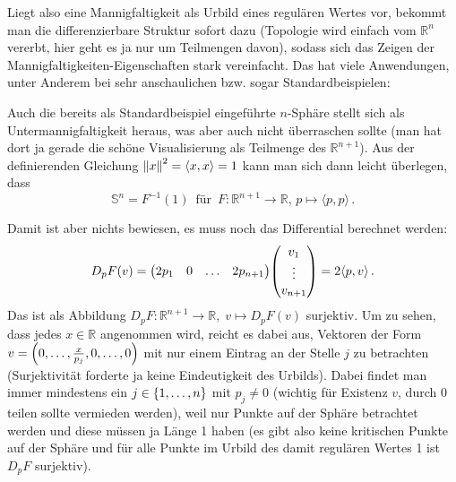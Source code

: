 \documentclass[../H_Analysis_main.tex]{subfiles}
\begin{document}
Liegt also eine Mannigfaltigkeit als Urbild eines regulären Wertes vor, bekommt man die differenzierbare Struktur sofort dazu (Topologie wird einfach vom $\mathbb{R}^n$ vererbt, hier geht es ja nur um Teilmengen davon), sodass sich das Zeigen der Mannigfaltigkeiten-Eigenschaften stark vereinfacht. Das hat viele Anwendungen, unter Anderem bei sehr anschaulichen bzw. sogar Standardbeispielen:
\begin{bsp}[Sphäre]\label{bsp:kugelumf}
Auch die bereits als Standardbeispiel eingeführte $n$-Sphäre stellt sich als Untermannigfaltigkeit heraus, was aber auch nicht überraschen sollte (man hat dort ja gerade die schöne Visualisierung als Teilmenge des $\mathbb{R}^{n + 1}$). Aus der definierenden Gleichung $\norm{x}^2 = \langle x, x \rangle = 1$ kann man sich dann leicht überlegen, dass
\begin{equation}
\mathbb{S}^n = F^{-1}(1) \,  \text{ für } \, F: \mathbb{R}^{n+1} \rightarrow \mathbb{R}, \, p \mapsto \langle p, p \rangle \, .
\end{equation}

Damit ist aber nichts bewiesen, es muss noch das Differential berechnet werden:
\begin{equation}
D_p F(v) = \mqty(2 p_1 & 0 & \dots & 2 p_{n + 1}) \mqty(v_1 \\ \vdots \\ v_{n + 1}) = 2 \langle p, v \rangle \, .
\end{equation}
Das ist als Abbildung $D_p F: \mathbb{R}^{n + 1} \rightarrow \mathbb{R}, \; v \mapsto D_p F(v)$ surjektiv. Um zu sehen, dass jedes $x \in \mathbb{R}$ angenommen wird, reicht es dabei aus, Vektoren der Form $v = \qty(0, \dots, \frac{x}{p_j}, 0, \dots, 0)$ mit nur einem Eintrag an der Stelle $j$ zu betrachten (Surjektivität forderte ja keine Eindeutigkeit des Urbilds). Dabei findet man immer mindestens ein $j \in \qty{1, \dots, n}$ mit $p_j \neq 0$ (wichtig für Existenz $v$, durch 0 teilen sollte vermieden werden), weil nur Punkte auf der Sphäre betrachtet werden und diese müssen ja Länge 1 haben (es gibt also keine kritischen Punkte auf der Sphäre und für alle Punkte im Urbild des damit regulären Wertes 1 ist $D_p F$ surjektiv).\\



\end{bsp}
\end{document}
